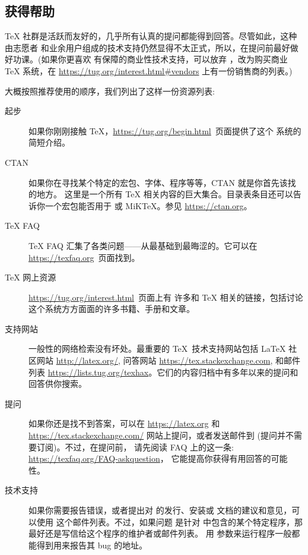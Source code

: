 \documentclass{article}
\begin{document}
\subsection{获得帮助}
\label{sec:help}

\TeX{} 社群是活跃而友好的，几乎所有认真的提问都能得到回答。尽管如此，这种由志愿者
和业余用户组成的技术支持仍然显得不太正式，所以，在提问前最好做好功课。(如果你更喜欢
有保障的商业性技术支持，可以放弃 \TL{}，改为购买商业 \TeX{} 系统，在
\url{https://tug.org/interest.html#vendors} 上有一份销售商的列表。)

大概按照推荐使用的顺序，我们列出了这样一份资源列表: 

\begin{description}
\item [起步] 如果你刚刚接触 \TeX，\url{https://tug.org/begin.html}~页面提供了这个
系统的简短介绍。

\item [CTAN] 如果你在寻找某个特定的宏包、字体、程序等等，CTAN 就是你首先该找的地方。
这里是一个所有 \TeX{} 相关内容的巨大集合。目录表条目还可以告诉你一个宏包能否用于 \TL{}
或 MiK\TeX。参见 \url{https://ctan.org}。

\item [\TeX{} FAQ] \TeX{} FAQ 汇集了各类问题——从最基础到最晦涩的。它可以在
\url{https://texfaq.org}~页面找到。

\item [\TeX{} 网上资源] \url{https://tug.org/interest.html}~页面上有
许多和 \TeX{} 相关的链接，包括讨论这个系统方方面面的许多书籍、手册和文章。

\item [支持网站] 一般性的网络检索没有坏处。最重要的 \TeX\ 技术支持网站包括
\LaTeX{} 社区网站 \url{http://latex.org/}, 问答网站 \url{https://tex.stackexchange.com},
和邮件列表 \url{https://lists.tug.org/texhax}。它们的内容归档中有多年以来的提问和
回答供你搜索。

\item [提问] 如果你还是找不到答案，可以在 \url{https://latex.org} 和
\url{https://tex.stackexchange.com/} 网站上提问，或者发送邮件到
 (提问并不需要订阅)。不过，在提问前，
请先阅读 FAQ 上的这一条: \url{https://texfaq.org/FAQ-askquestion}，
它能提高你获得有用回答的可能性。

\item [\TL{} 技术支持] 如果你需要报告错误，或者提出对 \TL{} 的发行、安装或
文档的建议和意见，可以使用  这个邮件列表。不过，如果问题
是针对 \TL{} 中包含的某个特定程序，那最好还是写信给这个程序的维护者或邮件列表。
用  参数来运行程序一般都能得到用来报告其 bug 的地址。

\end{description}
\end{document}
